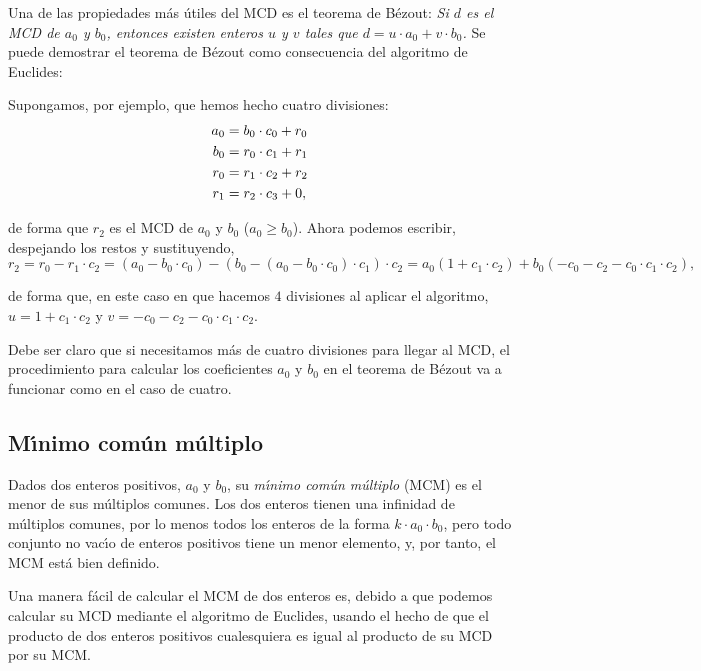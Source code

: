Una de las propiedades m\'as \'utiles del MCD es el teorema de Bézout: {\itshape
Si $d$ es el MCD de $a_0$ y $b_0$, entonces 
existen enteros $u$ y $v$ tales que $d=u\cdot a_0+v\cdot b_0$.}
\label{bezout}
\bigbreak
Se puede demostrar  el teorema de Bézout como consecuencia 
del algoritmo de Euclides: 

Supongamos, por ejemplo, que hemos hecho cuatro divisiones:
\begin{equation}\notag
 \begin{aligned}
  a_0 &= b_0\cdot c_0+r_0\\
  b_0 &= r_0\cdot c_1+r_1\\
  r_0 &= r_1\cdot c_2+r_2\\
  r_1 &= r_2\cdot c_3 +0,
  \end{aligned}
\end{equation}

\noindent de forma que $r_2$ es el MCD de $a_0$ y $b_0$ ($a_0\ge b_0$). Ahora
podemos
escribir, despejando los restos y sustituyendo, 
\[r_2=r_0-r_1\cdot c_2=(a_0-b_0\cdot c_0)-(b_0-(a_0-b_0\cdot c_0)\cdot c_1)\cdot
c_2=
a_0(1+c_1\cdot c_2)+b_0(-c_0-c_2-c_0\cdot c_1\cdot c_2),\]

\noindent de forma que, en este caso en que hacemos $4$ divisiones al aplicar el
algoritmo,  $u=1+c_1\cdot c_2$ y $v=-c_0-c_2-c_0\cdot c_1\cdot c_2$.



Debe ser claro que si necesitamos m\'as de cuatro divisiones para llegar al MCD,
el procedimiento para calcular los coeficientes $a_0$ y $b_0$ en el teorema de
Bézout va a funcionar como en el caso de cuatro.

\subsection{M\'{\i}nimo com\'un m\'ultiplo}

Dados dos enteros positivos, $a_0$ y $b_0$, su {\itshape m\'{\i}nimo com\'un
m\'ultiplo} (MCM) es el menor de sus m\'ultiplos comunes.  Los dos enteros
tienen una infinidad de m\'ultiplos comunes, por lo menos todos los enteros de
la forma $k\cdot a_0\cdot b_0$, pero todo conjunto no vac\'{\i}o de enteros
positivos tiene un menor elemento, y, por tanto, el MCM est\'a bien definido.


Una manera f\'acil de calcular el MCM de dos enteros es, debido a que podemos
calcular su MCD mediante el algoritmo de Euclides,  usando el hecho de que el
producto de dos enteros positivos cualesquiera es igual al producto de su MCD
por su MCM.




